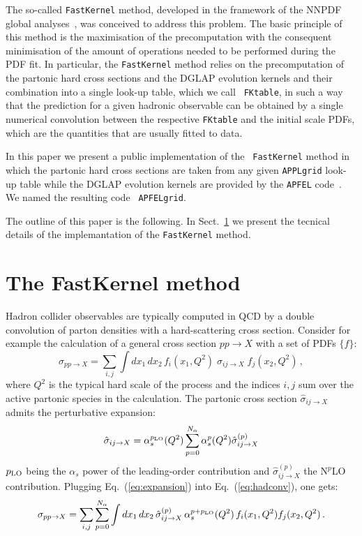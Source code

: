 \documentclass[preprint,12pt]{elsarticle}
\begin{document}
The so-called {\tt FastKernel} method, developed in the framework of
the NNPDF global analyses~\cite{Ball:2010de}, was conceived to address
this problem. The basic principle of this method is the maximisation
of the precomputation with the consequent minimisation of the amount
of operations needed to be performed during the PDF fit. In
particular, the {\tt FastKernel} method relies on the precomputation
of the partonic hard cross sections and the DGLAP evolution kernels
and their combination into a single look-up table, which we call {\tt
  FKtable}, in such a way that the prediction for a given hadronic
observable can be obtained by a single numerical convolution between
the respective {\tt FKtable} and the initial scale PDFs, which are
the quantities that are usually fitted to data.

In this paper we present a public implementation of the {\tt
  FastKernel} method in which the partonic hard cross sections are
taken from any given {\tt APPLgrid} look-up table while the DGLAP
evolution kernels are provided by the {\tt APFEL}
code~\cite{Bertone:2013vaa}. We named the resulting code {\tt
  APFELgrid}.

The outline of this paper is the following. In
Sect.~\ref{sec:FastKernel} we present the tecnical details of the
implemantation of the {\tt FastKernel} method.

\section{The FastKernel method}\label{sec:FastKernel}

Hadron collider observables are typically computed in QCD by a double
convolution of parton densities with a hard-scattering cross
section. Consider for example the calculation of a general cross
section $pp\to X$ with a set of PDFs $\{f\}$:
\begin{equation} \label{eq:hadconv}
  \sigma_{pp\to X} =
  \sum_{i,j}\int dx_1\, dx_2\, f_i(x_1,Q^2)\;
  \hat{\sigma}_{ij\to X}\; f_j(x_2,Q^2)\,,
\end{equation}
where $Q^2$ is the typical hard scale of the process and the indices
$i,j$ sum over the active partonic species in the calculation. The
partonic cross section $\hat{\sigma}_{ij\to X}$ admits the
perturbative expansion:
\begin{equation}\label{eq:expansion}
\hat{\sigma}_{ij\to X} = \alpha_s^{p_{\rm LO}}(Q^2) \sum_{p=0}^{N_\alpha} \alpha_s^{p}(Q^2)\hat{\sigma}^{(p)}_{ij\to X}
\end{equation}
$p_{\rm LO}$ being the $\alpha_s$ power of the leading-order
contribution and $\hat{\sigma}^{(p)}_{ij\to X}$ the N$^p$LO
contribution. Plugging Eq.~(\ref{eq:expansion}) into
Eq.~(\ref{eq:hadconv}), one gets:
\begin{equation}\label{eq:pertexp}
  \sigma_{pp\to X} =
  \sum_{i,j}\sum_{p=0}^{N_\alpha} \int dx_1\,dx_2\,
  \hat{\sigma}^{(p)}_{ij\to X}\,\alpha_s^{p+p_{\rm LO}}(Q^2) \,f_i(x_1,Q^2) f_j(x_2,Q^2)\,.
\end{equation}
\end{document}

